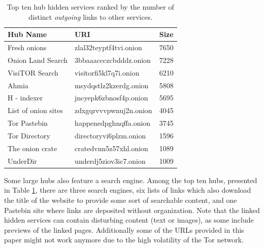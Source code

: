 \iflncs
  \begin{table}
    \vspace{-22pt}
    \begin{tabular}{l | l | r}
      \hline
      \textbf{Hub Name} & \textbf{URI} & \textbf{Size} \\
      \hline
      \hline
      Fresh onions & zlal32teyptf4tvi.onion  &  7650\\
      \hline
      Onion Land Search & 3bbaaaccczcbdddz.onion  &  7228\\
      \hline
      VisiTOR Search & visitorfi5kl7q7i.onion  &  6210\\
      \hline
      Ahmia & msydqstlz2kzerdg.onion  &  5808\\
      \hline
      H - indexer & jncyepk6zbnosf4p.onion  &  5695\\
      \hline
      List of onion sites & zdxgqrvvvpwnuj2n.onion  &  4045\\
      \hline
      Tor Pastebin & happenedpghnqffa.onion  &  3745\\
      \hline
      Tor Directory & directoryvi6plzm.onion  &  1596\\
      \hline
      The onion crate & cratedvnn5z57xhl.onion  &  1089\\
      \hline
      UnderDir & underdj5ziov3ic7.onion  &  1009\\
      \hline
    \end{tabular}
    \caption{Top ten hub hidden services ranked by the number of distinct \emph{outgoing} links to other services.}\label{table:toptenout}
  \end{table}
\fi

Some large hubs also feature a search engine. Among the top ten hubs, presented in Table \ref{table:toptenout}, there are three search engines, six lists of links which also download the title of the website to provide some sort of searchable content, and one Pastebin site where links are deposited without organization. Note that the linked hidden services can contain disturbing content (text or images), as some include previews of the linked pages. Additionally some of the URLs provided in this paper might not work anymore due to the high volatility of the Tor network. %


